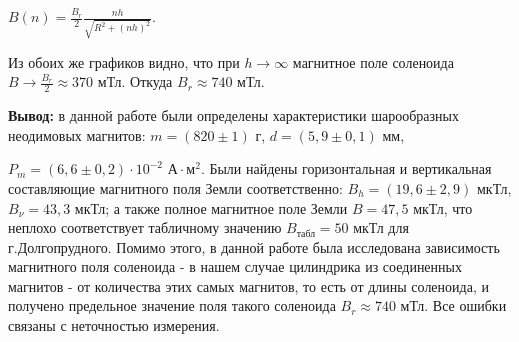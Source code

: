 \documentclass[a4paper,12pt]{article} %
\begin{document}
$B(n) = \frac{B_r}{2}\frac{nh}{\sqrt{R^2 + (nh)^2}}$.

Из обоих же графиков видно, что при $h \longrightarrow \infty$ магнитное поле соленоида $B \longrightarrow \frac{B_r}{2} \approx 370$ мТл. Откуда $B_r \approx 740$ мТл.

\vspace{30mm}

\textbf{{\normalsize Вывод:}} в данной работе были определены характеристики шарообразных неодимовых магнитов: $m = (820 \pm 1)$ г, $d = (5,9 \pm 0,1)$ мм, 

\noindent $P_m = (6,6 \pm 0,2) \cdot 10^{-2} \text{ А} \cdot \text{м}^2$. Были найдены горизонтальная и вертикальная составляющие магнитного поля Земли соответственно: $B_h = (19,6 \pm 2,9)$ мкТл, $B_{\nu} = 43,3$ мкТл; а также полное магнитное поле Земли $B = 47,5$ мкТл, что неплохо соответствует табличному значению $B_{\text{табл}} = 50$ мкТл для г.Долгопрудного. Помимо этого, в данной работе была исследована зависимость магнитного поля соленоида - в нашем случае цилиндрика из соединенных магнитов - от количества этих самых магнитов, то есть от длины соленоида, и получено предельное значение поля такого соленоида $B_r \approx 740$ мТл. Все ошибки связаны с неточностью измерения.
\end{document}

